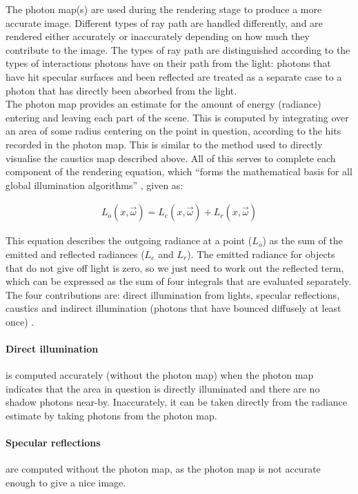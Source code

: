 \documentclass[a4paper]{article}
\begin{document}
The photon map(s) are used during the rendering stage to produce a more accurate image. Different types of ray path are handled differently, and are rendered either accurately or inaccurately depending on how much they contribute to the image. The types of ray path are distinguished according to the types of interactions photons have on their path from the light: photons that have hit specular surfaces and been reflected are treated as a separate case to a photon that has directly been absorbed from the light.\\

The photon map provides an estimate for the amount of energy (radiance) entering and leaving each part of the scene. This is computed by integrating over an area of some radius centering on the point in question, according to the hits recorded in the photon map. This is similar to the method used to directly visualise the caustics map described above. All of this serves to complete each component of the rendering equation, which ``forms the mathematical basis for all global illumination algorithms'' \cite{Jensen2001RealisticIS}, given as:

\begin{align*}
    L_{o}(x, \overrightarrow{\omega}) = L_{e}(x, \overrightarrow{\omega}) + L_{r}(x, \overrightarrow{\omega})
\end{align*}

This equation describes the outgoing radiance at a point ($L_{o}$) as the sum of the emitted and reflected radiances ($L_{e}$ and $L_{r}$). The emitted radiance for objects that do not give off light is zero, so we just need to work out the reflected term, which can be expressed as the sum of four integrals that are evaluated separately. The four contributions are: direct illumination from lights, specular reflections, caustics and indirect illumination (photons that have bounced diffusely at least once) \cite{Jensen1996photonmaps}.\\

\paragraph{Direct illumination} is computed accurately (without the photon map) when the photon map indicates that the area in question is directly illuminated and there are no shadow photons near-by. Inaccurately, it can be taken directly from the radiance estimate by taking photons from the photon map.

\paragraph{Specular reflections} are computed without the photon map, as the photon map is not accurate enough to give a nice image.
\end{document}
